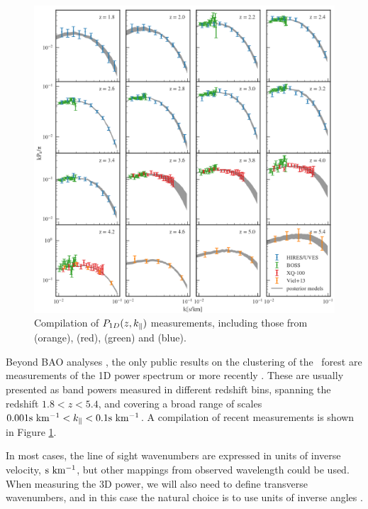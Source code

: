 \begin{figure}[h]
 \begin{center}
  \includegraphics[scale=0.34]{Figures/Walther2018_P1D}
 \end{center}
 \caption{Compilation of $P_{1D}(z,k_\parallel)$ measurements, including those from
  \cite{Viel2013} (orange), \cite{Irsic2017} (red), 
  \cite{Palanque-Delabrouille2013} (green) and \cite{Walther2018a} (blue). 
 }
 \label{fig:dataP1D}
\end{figure}

Beyond BAO analyses \cite{Bautista2017,duMasdesBourboux2017}, the only 
public results on the clustering of the \lya\ forest are measurements of 
the 1D power spectrum \cite{Croft1998,McDonald2000,McDonald2006} or 
more recently \cite{Viel2013,Palanque-Delabrouille2013,Irsic2017,Walther2018a}.
These are usually presented as band powers measured in different redshift
bins, spanning the redshift $1.8 < z < 5.4$, and covering a broad range of 
scales $0.001 {\rm s~km^{-1}} < k_\parallel < 0.1 {\rm s~km^{-1}}$. 
A compilation of recent measurements is shown in Figure \ref{fig:dataP1D}.

In most cases, the line of sight wavenumbers are expressed in units of 
inverse velocity, ${\rm s~km^{-1}}$, but other mappings from observed wavelength 
could be used.
When measuring the 3D power, we will also need to define transverse 
wavenumbers, and in this case the natural choice is to use units of 
inverse angles \cite{Font-Ribera2018}.


